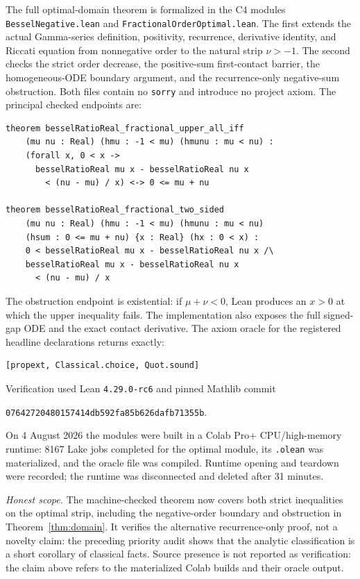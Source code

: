 \documentclass[11pt]{article}
\theoremstyle{remark}
\begin{document}
\begin{sloppypar}
The full optimal-domain theorem is formalized in the C4 modules
\texttt{BesselNegative.lean} and
\texttt{FractionalOrderOptimal.lean}.  The first extends the actual
Gamma-series definition, positivity, recurrence, derivative identity,
and Riccati equation from nonnegative order to the natural strip
$\nu>-1$.  The second checks the strict order decrease, the positive-sum
first-contact barrier, the homogeneous-ODE boundary argument, and the
recurrence-only negative-sum obstruction.  Both files contain no
\texttt{sorry} and introduce no project axiom.  The principal checked
endpoints are:
\end{sloppypar}
\begin{verbatim}
theorem besselRatioReal_fractional_upper_all_iff
    (mu nu : Real) (hmu : -1 < mu) (hmunu : mu < nu) :
    (forall x, 0 < x ->
      besselRatioReal mu x - besselRatioReal nu x
        < (nu - mu) / x) <-> 0 <= mu + nu

theorem besselRatioReal_fractional_two_sided
    (mu nu : Real) (hmu : -1 < mu) (hmunu : mu < nu)
    (hsum : 0 <= mu + nu) {x : Real} (hx : 0 < x) :
    0 < besselRatioReal mu x - besselRatioReal nu x /\
    besselRatioReal mu x - besselRatioReal nu x
      < (nu - mu) / x
\end{verbatim}
The obstruction endpoint is existential: if $\mu+\nu<0$, Lean produces
an $x>0$ at which the upper inequality fails.  The implementation also
exposes the full signed-gap ODE and the exact contact derivative.  The
axiom oracle for the registered headline declarations returns exactly:
\begin{verbatim}
[propext, Classical.choice, Quot.sound]
\end{verbatim}
Verification used Lean \texttt{4.29.0-rc6} and pinned Mathlib commit
\begin{center}\small
\texttt{07642720480157414db592fa85b626dafb71355b}.
\end{center}
On 4 August 2026 the modules were built in a Colab Pro+
CPU/high-memory runtime: 8167 Lake jobs completed for the optimal
module, its \texttt{.olean} was materialized, and the oracle file was
compiled.  Runtime opening and teardown were recorded; the runtime was
disconnected and deleted after 31 minutes.

\emph{Honest scope.}  The machine-checked theorem now covers both strict
inequalities on the optimal strip, including the negative-order
boundary and obstruction in Theorem~\ref{thm:domain}.  It verifies the
alternative recurrence-only proof, not a novelty claim: the preceding
priority audit shows that the analytic classification is a short corollary
of classical facts.  Source presence is not reported as
verification: the claim above refers to the materialized Colab builds
and their oracle output.
\end{document}

